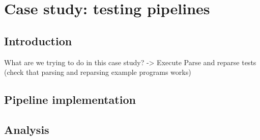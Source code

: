 \chapter{\label{chap:testing}Case study: testing pipelines}

\section{\label{sec:testing__introduction}Introduction}
What are we trying to do in this case study?
-> Execute Parse and reparse tests (check that parsing and reparsing example programs works)


\section{\label{sec:testing__implementation}Pipeline implementation}


\section{\label{sec:testing__analysis}Analysis}


